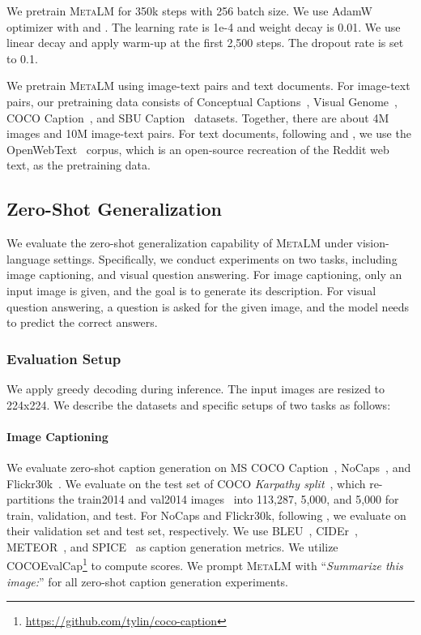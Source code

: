 \documentclass{article}
\theoremstyle{plain}
\theoremstyle{definition}
\theoremstyle{remark}
\newcommand\ours{\textsc{MetaLM}}
\begin{document}
We pretrain \ours{} for 350k steps with 256 batch size. We use AdamW optimizer with  and . The learning rate is 1e-4 and weight decay is 0.01. We use linear decay and apply warm-up at the first 2,500 steps.
The dropout rate is set to 0.1.


We pretrain \ours{} using image-text pairs and text documents.
For image-text pairs, our pretraining data consists of Conceptual Captions~\citep{sharma2018conceptual}, Visual Genome~\citep{krishna2017vg}, COCO Caption~\citep{chen2015cococaption}, and SBU Caption~\citep{ordonez2011sbu} datasets.
Together, there are about 4M images and 10M image-text pairs.
For text documents, following \citep{roberta} and \citep{gpt2}, we use the OpenWebText~\citep{Aaron2019OpenWebText} corpus, which is an open-source recreation of the Reddit web text, as the pretraining data.



\subsection{Zero-Shot Generalization}
\label{sec:vl:zeroshot}

We evaluate the zero-shot generalization capability of \ours{} under vision-language settings.
Specifically, we conduct experiments on two tasks, including image captioning, and visual question answering.
For image captioning, only an input image is given, and the goal is to generate its description.
For visual question answering, a question is asked for the given image, and the model needs to predict the correct answers.


\subsubsection{Evaluation Setup}
\label{sec:Zero-shotEvaluationSetup}

We apply greedy decoding during inference.
The input images are resized to 224x224.
We describe the datasets and specific setups of two tasks as follows:

\paragraph{Image Captioning}
We evaluate zero-shot caption generation on MS COCO Caption~\citep{chen2015cococaption}, NoCaps~\citep{agrawal2019nocaps}, and Flickr30k~\citep{young2014flickr30k}.
We evaluate on the test set of COCO \textit{Karpathy split}~\citep{karpathy2017deep}, which re-partitions the train2014 and val2014 images~\citep{lin2014coco} into 113,287, 5,000, and 5,000 for train, validation, and test.
For NoCaps and Flickr30k, following \citep{jin2022fewVLM}, we evaluate on their validation set and test set, respectively.
We use BLEU~\citep{papineni2002bleu}, CIDEr~\citep{vedantam2015cider}, METEOR~\citep{banerjee2005meteor}, and SPICE~\citep{anderson2016spice} as caption generation metrics.
We utilize COCOEvalCap\footnote{\url{https://github.com/tylin/coco-caption}} to compute scores.
We prompt \ours{} with ``\textit{Summarize this image:}'' for all zero-shot caption generation experiments.
\end{document}
